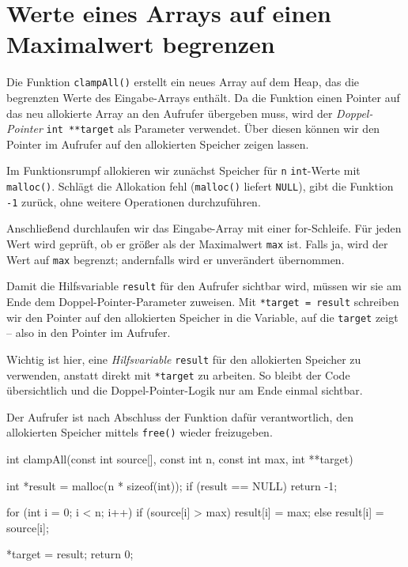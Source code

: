 \chapter{Werte eines Arrays auf einen Maximalwert begrenzen}

Die Funktion \texttt{clampAll()} erstellt ein neues Array auf dem Heap,
das die begrenzten Werte des Eingabe-Arrays enthält. Da die Funktion einen
Pointer auf das neu allokierte Array an den Aufrufer übergeben muss, wird der
\textit{Doppel-Pointer} \texttt{int **target} als Parameter verwendet.
Über diesen können wir den Pointer im Aufrufer auf den allokierten Speicher
zeigen lassen.

Im Funktionsrumpf allokieren wir zunächst Speicher für \texttt{n}
\texttt{int}-Werte mit \texttt{malloc()}. Schlägt die Allokation
fehl (\texttt{malloc()} liefert \texttt{NULL}), gibt die
Funktion \texttt{-1} zurück, ohne weitere Operationen durchzuführen.

Anschließend durchlaufen wir das Eingabe-Array mit einer for-Schleife. Für
jeden Wert wird geprüft, ob er größer als der Maximalwert
\texttt{max} ist. Falls ja, wird der Wert auf \texttt{max}
begrenzt; andernfalls wird er unverändert übernommen.

Damit die Hilfsvariable \texttt{result} für den Aufrufer sichtbar
wird, müssen wir sie am Ende dem Doppel-Pointer-Parameter zuweisen. Mit
\texttt{*target = result} schreiben wir den Pointer auf den
allokierten Speicher in die Variable, auf die \texttt{target} zeigt --
also in den Pointer im Aufrufer.

Wichtig ist hier, eine \textit{Hilfsvariable} \texttt{result} für den
allokierten Speicher zu verwenden, anstatt direkt mit \texttt{*target}
zu arbeiten. So bleibt der Code übersichtlich und die Doppel-Pointer-Logik
nur am Ende einmal sichtbar.

Der Aufrufer ist nach Abschluss der Funktion dafür verantwortlich, den
allokierten Speicher mittels \texttt{free()} wieder freizugeben.

\begin{codebox}[lang=c, fontsize=\small]
int clampAll(const int source[], const int n, const int max,
             int **target) {
    int *result = malloc(n * sizeof(int));
    if (result == NULL) {
        return -1;
    }

    for (int i = 0; i < n; i++) {
        if (source[i] > max) {
            result[i] = max;
        } else {
            result[i] = source[i];
        }
    }

    *target = result;
    return 0;
}
\end{codebox}




